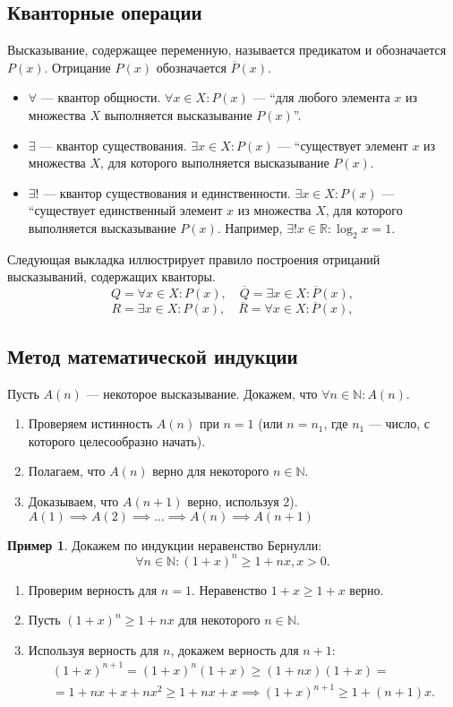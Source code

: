 \documentclass[a4paper,12pt]{article} %
\theoremstyle{remark}
\theoremstyle{definition}
\newtheorem{exmp}{Пример}[section]
\begin{document}
\subsection{Кванторные операции}

Высказывание, содержащее переменную, называется предикатом и обозначается $P(x)$.
Отрицание $P(x)$ обозначается $\overline{P}(x)$.

\begin{itemize}
	\item $\forall $ --- квантор общности. $\forall x \in X : P(x)$ --- ``для любого элемента $x$ из множества $X$ выполняется высказывание $P(x)$''.
	\item $\exists $ --- квантор существования. $\exists x \in X : P(x)$ --- ``существует элемент $x$ из множества $X$, для которого выполняется высказывание $P(x)$.
	\item $\exists !$ --- квантор существования и единственности. $\exists x \in X : P(x)$ --- ``существует единственный элемент $x$ из множества $X$, для которого выполняется высказывание $P(x)$. Например, $\exists ! x \in \mathbb{R} : \log_2 x = 1$.
\end{itemize}

Следующая выкладка иллюстрирует правило построения отрицаний высказываний, содержащих кванторы.
\[
Q = \forall x \in X : P(x), \quad \overline{Q} = \exists x \in X : \overline{P}(x)
,\] 
\[
R = \exists x \in X : P(x), \quad \overline{R} = \forall x \in X : \overline{P}(x)
,\] 
\subsection{Метод математической индукции}
Пусть $A(n)$ --- некоторое высказывание. Докажем, что $\forall n\in \mathbb{N} : A(n)$.
\begin{enumerate}
	\item Проверяем истинность $A(n)$ при $n=1$ (или $n=n_1$, где $n_1$ --- число, с которого целесообразно начать).
	\item Полагаем, что $A(n)$ верно для некоторого $n\in \mathbb{N}$.
	\item Доказываем, что $A(n+1)$ верно, используя 2). $A(1) \implies A(2) \implies \ldots \implies A(n) \implies A(n+1)$ 
\end{enumerate}

\begin{exmp}
	Докажем по индукции неравенство Бернулли:
\[
\forall n \in  \mathbb{N} : (1+x)^{n} \ge  1 + nx, x > 0
.\] 
\begin{enumerate}
	\item Проверим верность для $n = 1$. Неравенство $1 + x \ge  1 + x$ верно.
	\item Пусть $(1+x)^{n} \ge  1 + nx$ для некоторого $n \in \mathbb{N}$.
	\item Используя верность для $n$, докажем верность для $n+1$:
		\begin{multline}
		(1+x)^{n+1} = (1+x)^{n}(1+x) \ge (1+nx)(1+x) = \\
		= 1 + nx + x + nx^2 \ge 1 + nx + x \implies (1+x)^{n+1} \ge  1 + (n+1)x. 	
		\end{multline}
\end{enumerate}

\end{exmp}
\newpage
\end{document}

